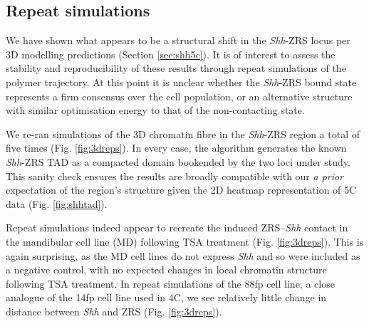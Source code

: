 \documentclass[a4paper,11pt,oneside]{book}
\begin{document}
\subsection{Repeat simulations}

We have shown what appears to be a structural shift in the \emph{Shh}-ZRS locus per 3D modelling predictions (Section \ref{sec:shh5c}). It is of interest to assess the stability and reproducibility of these results through repeat simulations of the polymer trajectory. At this point it is unclear whether the \emph{Shh}-ZRS bound state represents a firm consensus over the cell population, or an alternative structure with similar optimisation energy to that of the non-contacting state. 


We re-ran simulations of the 3D chromatin fibre in the \emph{Shh}-ZRS region a total of five times (Fig. \ref{fig:3dreps}). In every case, the algorithm generates the known \emph{Shh}-ZRS TAD as a compacted domain bookended by the two loci under study. This sanity check ensures the results are broadly compatible with our \emph{a prior} expectation of the region's structure given the 2D heatmap representation of 5C data (Fig. \ref{fig:shhtad}).

Repeat simulations indeed appear to recreate the induced ZRS--\emph{Shh} contact in the mandibular cell line (MD) following TSA treatment (Fig. \ref{fig:3dreps}). This is again surprising, as the MD cell lines do not express \emph{Shh} and so were included as a negative control, with no expected changes in local chromatin structure following TSA treatment. In repeat simulations of the 88fp cell line, a close analogue of the 14fp cell line used in 4C, we see relatively little change in distance between \emph{Shh} and ZRS (Fig. \ref{fig:3dreps}). 
\end{document}
